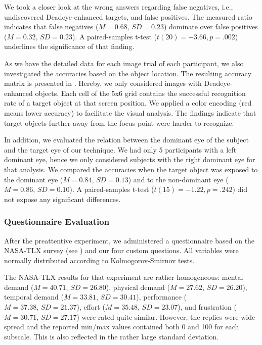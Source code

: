\documentclass[journal]{vgtc}                %
\begin{document}
We took a closer look at the wrong answers regarding false negatives, i.e., undiscovered Deadeye-enhanced targets, and false positives. The measured ratio indicates that false negatives ($M = 0.68,\,SD = 0.23$) dominate over false positives ($M = 0.32,\,SD = 0.23$). A paired-samples t-test ($t(20) = -3.66, p = .002$) underlines the significance of that finding.

As we have the detailed data for each image trial of each participant, we also investigated the accuracies based on the object location. The resulting accuracy matrix is presented in . Hereby, we only considered images with Deadeye-enhanced objects. Each cell of the 5x6 grid contains the successful recognition rate of a target object at that screen position. We applied a color encoding (red means lower accuracy) to facilitate the visual analysis. The findings indicate that target objects further away from the focus point were harder to recognize.

In addition, we evaluated the relation between the dominant eye of the subject and the target eye of our technique. We had only 5 participants with a left dominant eye, hence we only considered subjects with the right dominant eye for that analysis. We compared the accuracies when the target object was exposed to the dominant eye ($M = 0.84,\,SD = 0.13$) and to the non-dominant eye ($M = 0.86,\,SD = 0.10$). A paired-samples t-test ($t(15) = -1.22, p = .242$) did not expose any significant differences.



\subsubsection{Questionnaire Evaluation}

After the preattentive experiment, we administered a questionnaire based on the NASA-TLX survey (see ) and our four custom questions. All variables were normally distributed according to Kolmogorov-Smirnov tests. 


The NASA-TLX results for that experiment are rather homogeneous: mental demand ($M = 40.71,\,SD = 26.80$), physical demand ($M = 27.62,\,SD = 26.20$), temporal demand ($M = 33.81,\,SD = 30.41$), performance ($M = 37.38,\,SD = 21.37$), effort ($M = 35.48,\,SD = 23.07$), and frustration ($M = 30.71,\,SD = 27.17$) were rated quite similar. However, the replies were wide spread and the reported min/max values contained both 0 and 100 for each subscale. This is also reflected in the rather large standard deviation.
\end{document}
